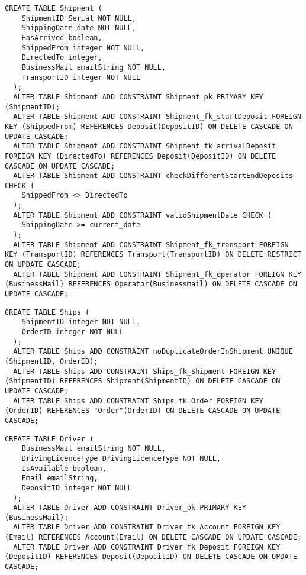 \newpage
\begin{lstlisting}[caption={Creazione della tabella \textbf{Shipment}}]
  CREATE TABLE Shipment (
    ShipmentID Serial NOT NULL,
    ShippingDate date NOT NULL,
    HasArrived boolean,
    ShippedFrom integer NOT NULL,
    DirectedTo integer,
    BusinessMail emailString NOT NULL,
    TransportID integer NOT NULL
  );
  ALTER TABLE Shipment ADD CONSTRAINT Shipment_pk PRIMARY KEY (ShipmentID);
  ALTER TABLE Shipment ADD CONSTRAINT Shipment_fk_startDeposit FOREIGN KEY (ShippedFrom) REFERENCES Deposit(DepositID) ON DELETE CASCADE ON UPDATE CASCADE;
  ALTER TABLE Shipment ADD CONSTRAINT Shipment_fk_arrivalDeposit FOREIGN KEY (DirectedTo) REFERENCES Deposit(DepositID) ON DELETE CASCADE ON UPDATE CASCADE;
  ALTER TABLE Shipment ADD CONSTRAINT checkDifferentStartEndDeposits CHECK (
    ShippedFrom <> DirectedTo
  );
  ALTER TABLE Shipment ADD CONSTRAINT validShipmentDate CHECK (
    ShippingDate >= current_date
  );
  ALTER TABLE Shipment ADD CONSTRAINT Shipment_fk_transport FOREIGN KEY (TransportID) REFERENCES Transport(TransportID) ON DELETE RESTRICT ON UPDATE CASCADE;
  ALTER TABLE Shipment ADD CONSTRAINT Shipment_fk_operator FOREIGN KEY (BusinessMail) REFERENCES Operator(Businessmail) ON DELETE CASCADE ON UPDATE CASCADE;
\end{lstlisting} %

\begin{lstlisting}[caption={Creazione della tabella \textbf{Ships}}]
  CREATE TABLE Ships ( 
    ShipmentID integer NOT NULL,
    OrderID integer NOT NULL
  );
  ALTER TABLE Ships ADD CONSTRAINT noDuplicateOrderInShipment UNIQUE (ShipmentID, OrderID);
  ALTER TABLE Ships ADD CONSTRAINT Ships_fk_Shipment FOREIGN KEY (ShipmentID) REFERENCES Shipment(ShipmentID) ON DELETE CASCADE ON UPDATE CASCADE;
  ALTER TABLE Ships ADD CONSTRAINT Ships_fk_Order FOREIGN KEY (OrderID) REFERENCES "Order"(OrderID) ON DELETE CASCADE ON UPDATE CASCADE;
\end{lstlisting}

\newpage
\begin{lstlisting}[caption={Creazione della tabella \textbf{Driver}}]
  CREATE TABLE Driver (
    BusinessMail emailString NOT NULL,
    DrivingLicenceType DrivingLicenceType NOT NULL,
    IsAvailable boolean,
    Email emailString, 
    DepositID integer NOT NULL 
  );
  ALTER TABLE Driver ADD CONSTRAINT Driver_pk PRIMARY KEY (BusinessMail);
  ALTER TABLE Driver ADD CONSTRAINT Driver_fk_Account FOREIGN KEY (Email) REFERENCES Account(Email) ON DELETE CASCADE ON UPDATE CASCADE;
  ALTER TABLE Driver ADD CONSTRAINT Driver_fk_Deposit FOREIGN KEY (DepositID) REFERENCES Deposit(DepositID) ON DELETE CASCADE ON UPDATE CASCADE;
\end{lstlisting}

